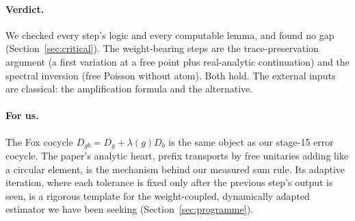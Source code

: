 \paragraph{Verdict.} We checked every step's logic and every computable lemma, and found no gap (Section~\ref{sec:critical}). The weight-bearing
steps are the trace-preservation argument (a first variation at a free point plus real-analytic continuation) and the spectral inversion
(free Poisson without atom). Both hold. The external inputs are classical: the amplification formula and the alternative.

\paragraph{For us.} The Fox cocycle $D_{gb}=D_g+\lambda(g)D_b$ is the same object as our stage-15 error cocycle. The paper's analytic heart, prefix
transports by free unitaries adding like a circular element, is the mechanism behind our measured sum rule. Its adaptive iteration, where each
tolerance is fixed only after the previous step's output is seen, is a rigorous template for the weight-coupled, dynamically adapted estimator
we have been seeking (Section~\ref{sec:programme}).
